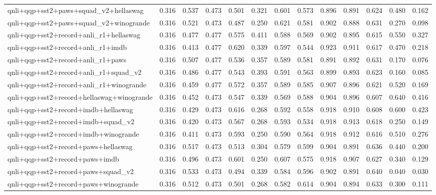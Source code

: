 \begin{table}[t]
\begin{tabular}{lrrrrrrrrrrrr}
    qnli+qqp+sst2+paws+squad\_v2+hellaswag & 0.316 & 0.537 & 0.473 & 0.501 & 0.321 & 0.601 & 0.573 & 0.896 & 0.891 & 0.624 & 0.480 & 0.162 \\
    qnli+qqp+sst2+paws+squad\_v2+winogrande & 0.316 & 0.521 & 0.473 & 0.487 & 0.250 & 0.621 & 0.581 & 0.902 & 0.888 & 0.631 & 0.270 & 0.098 \\
    qnli+qqp+sst2+record+anli\_r1+hellaswag & 0.316 & 0.477 & 0.477 & 0.575 & 0.411 & 0.588 & 0.569 & 0.902 & 0.895 & 0.615 & 0.550 & 0.327 \\
    qnli+qqp+sst2+record+anli\_r1+imdb & 0.316 & 0.413 & 0.477 & 0.620 & 0.339 & 0.597 & 0.544 & 0.923 & 0.911 & 0.617 & 0.470 & 0.218 \\
    qnli+qqp+sst2+record+anli\_r1+paws & 0.316 & 0.507 & 0.477 & 0.536 & 0.357 & 0.589 & 0.581 & 0.891 & 0.892 & 0.631 & 0.170 & 0.076 \\
    qnli+qqp+sst2+record+anli\_r1+squad\_v2 & 0.316 & 0.486 & 0.477 & 0.543 & 0.393 & 0.591 & 0.563 & 0.899 & 0.893 & 0.623 & 0.160 & 0.085 \\
    qnli+qqp+sst2+record+anli\_r1+winogrande & 0.316 & 0.459 & 0.477 & 0.572 & 0.357 & 0.589 & 0.585 & 0.907 & 0.896 & 0.621 & 0.520 & 0.169 \\
    qnli+qqp+sst2+record+hellaswag+winogrande & 0.316 & 0.452 & 0.473 & 0.547 & 0.339 & 0.569 & 0.588 & 0.904 & 0.896 & 0.607 & 0.640 & 0.416 \\
    qnli+qqp+sst2+record+imdb+hellaswag & 0.316 & 0.429 & 0.473 & 0.616 & 0.268 & 0.592 & 0.558 & 0.918 & 0.910 & 0.608 & 0.600 & 0.423 \\
    qnli+qqp+sst2+record+imdb+squad\_v2 & 0.316 & 0.420 & 0.473 & 0.567 & 0.268 & 0.593 & 0.534 & 0.918 & 0.913 & 0.618 & 0.250 & 0.149 \\
    qnli+qqp+sst2+record+imdb+winogrande & 0.316 & 0.411 & 0.473 & 0.593 & 0.250 & 0.590 & 0.564 & 0.918 & 0.912 & 0.616 & 0.510 & 0.276 \\
    qnli+qqp+sst2+record+paws+hellaswag & 0.316 & 0.517 & 0.473 & 0.513 & 0.304 & 0.579 & 0.599 & 0.904 & 0.891 & 0.636 & 0.440 & 0.200 \\
    qnli+qqp+sst2+record+paws+imdb & 0.316 & 0.496 & 0.473 & 0.601 & 0.250 & 0.607 & 0.575 & 0.918 & 0.907 & 0.627 & 0.340 & 0.129 \\
    qnli+qqp+sst2+record+paws+squad\_v2 & 0.316 & 0.533 & 0.473 & 0.494 & 0.339 & 0.584 & 0.596 & 0.902 & 0.891 & 0.640 & 0.040 & 0.030 \\
    qnli+qqp+sst2+record+paws+winogrande & 0.316 & 0.512 & 0.473 & 0.501 & 0.268 & 0.582 & 0.614 & 0.904 & 0.894 & 0.633 & 0.300 & 0.111 \\

\end{tabular}
\end{table}
